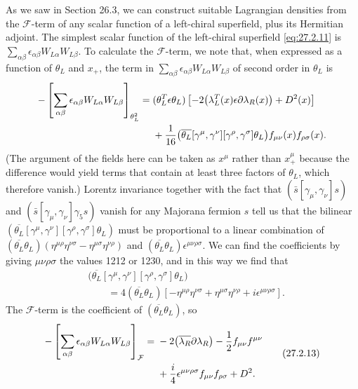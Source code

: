 As we saw in Section 26.3, we can construct suitable Lagrangian densities
from the \(\mathcal{F}\)-term of any scalar function of a left-chiral
superfield, plus its Hermitian adjoint. The simplest scalar function of the
left-chiral superfield \eqref{eq:27.2.11} is
\(\sum_{\alpha\beta}\epsilon_{\alpha\beta}W_{L\alpha}W_{L\beta}\).
To calculate the \(\mathcal{F}\)-term, we note that, when expressed as a
function of \(\theta_L\) and \(x_+\), the term in
\(\sum_{\alpha\beta}\epsilon_{\alpha\beta}W_{L\alpha}W_{L\beta}\) of
second order in \(\theta_L\) is
\[
  \begin{aligned}
  -\left[
    \sum_{\alpha\beta}\epsilon_{\alpha\beta}
      W_{L\alpha}W_{L\beta}
  \right]_{\theta_L^2}
  ={}&(\theta_L^T\epsilon\theta_L)
    \left[
      -2\bigl(\lambda_L^T(x)\epsilon
        \sl{\partial}\lambda_R(x)\bigr)+D^2(x)
    \right]
  \\
  &+\frac1{16}
    \bigl(\overline{\theta_L}[\gamma^\mu,\gamma^\nu]
      [\gamma^\rho,\gamma^\sigma]\theta_L\bigr)
    f_{\mu\nu}(x)f_{\rho\sigma}(x).
  \end{aligned}
\]
(The argument of the fields here can be taken as \(x^\mu\) rather than
\(x_+^\mu\) because the difference would yield terms that contain at least
three factors of \(\theta_L\), which therefore vanish.) Lorentz invariance
together with the fact that
\((\bar{s}[\gamma_\mu,\gamma_\nu]s)\) and
\((\bar{s}[\gamma_\mu,\gamma_\nu]\gamma_5s)\) vanish for any Majorana
fermion \(s\) tell us that the bilinear
\((\overline{\theta_L}[\gamma^\mu,\gamma^\nu]
[\gamma^\rho,\gamma^\sigma]\theta_L)\) must be proportional to a linear
combination of
\((\overline{\theta_L}\theta_L)
(\eta^{\mu\rho}\eta^{\nu\sigma}-\eta^{\mu\sigma}\eta^{\nu\rho})\)
and \((\overline{\theta_L}\theta_L)\epsilon^{\mu\nu\rho\sigma}\).
We can find the coefficients by giving \(\mu\nu\rho\sigma\) the values
1212 or 1230, and in this way we find that
\[
  \begin{aligned}
  &\bigl(\overline{\theta_L}[\gamma^\mu,\gamma^\nu]
    [\gamma^\rho,\gamma^\sigma]\theta_L\bigr)
  \\
  &\qquad
  =4(\overline{\theta_L}\theta_L)
    \left[
      -\eta^{\mu\rho}\eta^{\nu\sigma}
      +\eta^{\mu\sigma}\eta^{\nu\rho}
      +i\epsilon^{\mu\nu\rho\sigma}
    \right].
  \end{aligned}
\]
The \(\mathcal{F}\)-term is the coefficient of
\((\overline{\theta_L}\theta_L)\), so
\begin{equation}
  \begin{aligned}
  -\left[
    \sum_{\alpha\beta}\epsilon_{\alpha\beta}
      W_{L\alpha}W_{L\beta}
  \right]_{\mathcal{F}}
  ={}&-2\bigl(\overline{\lambda_R}\sl{\partial}\lambda_R\bigr)
    -\frac12f_{\mu\nu}f^{\mu\nu}
  \\
  &+\frac{i}{4}\epsilon^{\mu\nu\rho\sigma}
    f_{\mu\nu}f_{\rho\sigma}+D^2.
  \end{aligned}
  \tag{27.2.13}\label{eq:27.2.13}
\end{equation}

